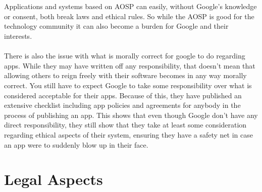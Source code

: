 \documentclass[conference]{IEEEtran}
\begin{document}
\\\\Applications and systems based on AOSP can easily, without Google's knowledge or consent, both break laws and ethical rules. So while the AOSP is good for the technology community it can also become a burden for Google and their interests.
\\\\There is also the issue with what is morally correct for google to do regarding apps. While they may have written off any responsibility, that doesn't mean that allowing others to reign freely with their software becomes in any way morally correct. You still have to expect Google to take some responsibility over what is considered acceptable for their apps. Because of this, they have published an extensive checklist including app policies and agreements for anybody in the process of publishing an app.\cite{app-publishing} This shows that even though Google don't have any direct responsibility, they still show that they take at least some consideration regarding ethical aspects of their system, ensuring they have a safety net in case an app were to suddenly blow up in their face. 


\section{Legal Aspects}
\label{legal}
\end{document}
